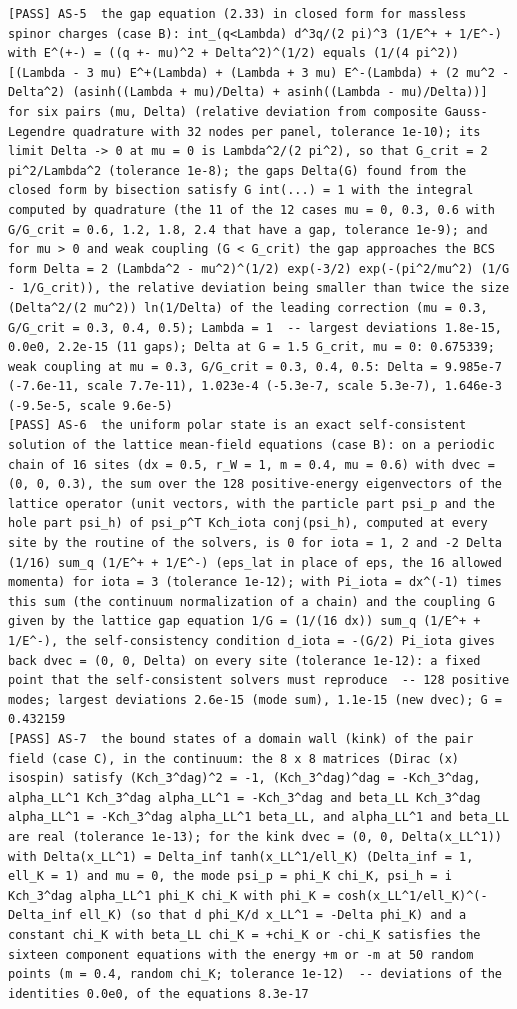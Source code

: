 \documentclass[
  10pt,
]{article}
\begin{document}
\begin{verbatim}
[PASS] AS-5  the gap equation (2.33) in closed form for massless spinor charges (case B): int_(q<Lambda) d^3q/(2 pi)^3 (1/E^+ + 1/E^-) with E^(+-) = ((q +- mu)^2 + Delta^2)^(1/2) equals (1/(4 pi^2)) [(Lambda - 3 mu) E^+(Lambda) + (Lambda + 3 mu) E^-(Lambda) + (2 mu^2 - Delta^2) (asinh((Lambda + mu)/Delta) + asinh((Lambda - mu)/Delta))] for six pairs (mu, Delta) (relative deviation from composite Gauss-Legendre quadrature with 32 nodes per panel, tolerance 1e-10); its limit Delta -> 0 at mu = 0 is Lambda^2/(2 pi^2), so that G_crit = 2 pi^2/Lambda^2 (tolerance 1e-8); the gaps Delta(G) found from the closed form by bisection satisfy G int(...) = 1 with the integral computed by quadrature (the 11 of the 12 cases mu = 0, 0.3, 0.6 with G/G_crit = 0.6, 1.2, 1.8, 2.4 that have a gap, tolerance 1e-9); and for mu > 0 and weak coupling (G < G_crit) the gap approaches the BCS form Delta = 2 (Lambda^2 - mu^2)^(1/2) exp(-3/2) exp(-(pi^2/mu^2) (1/G - 1/G_crit)), the relative deviation being smaller than twice the size (Delta^2/(2 mu^2)) ln(1/Delta) of the leading correction (mu = 0.3, G/G_crit = 0.3, 0.4, 0.5); Lambda = 1  -- largest deviations 1.8e-15, 0.0e0, 2.2e-15 (11 gaps); Delta at G = 1.5 G_crit, mu = 0: 0.675339; weak coupling at mu = 0.3, G/G_crit = 0.3, 0.4, 0.5: Delta = 9.985e-7 (-7.6e-11, scale 7.7e-11), 1.023e-4 (-5.3e-7, scale 5.3e-7), 1.646e-3 (-9.5e-5, scale 9.6e-5)
[PASS] AS-6  the uniform polar state is an exact self-consistent solution of the lattice mean-field equations (case B): on a periodic chain of 16 sites (dx = 0.5, r_W = 1, m = 0.4, mu = 0.6) with dvec = (0, 0, 0.3), the sum over the 128 positive-energy eigenvectors of the lattice operator (unit vectors, with the particle part psi_p and the hole part psi_h) of psi_p^T Kch_iota conj(psi_h), computed at every site by the routine of the solvers, is 0 for iota = 1, 2 and -2 Delta (1/16) sum_q (1/E^+ + 1/E^-) (eps_lat in place of eps, the 16 allowed momenta) for iota = 3 (tolerance 1e-12); with Pi_iota = dx^(-1) times this sum (the continuum normalization of a chain) and the coupling G given by the lattice gap equation 1/G = (1/(16 dx)) sum_q (1/E^+ + 1/E^-), the self-consistency condition d_iota = -(G/2) Pi_iota gives back dvec = (0, 0, Delta) on every site (tolerance 1e-12): a fixed point that the self-consistent solvers must reproduce  -- 128 positive modes; largest deviations 2.6e-15 (mode sum), 1.1e-15 (new dvec); G = 0.432159
[PASS] AS-7  the bound states of a domain wall (kink) of the pair field (case C), in the continuum: the 8 x 8 matrices (Dirac (x) isospin) satisfy (Kch_3^dag)^2 = -1, (Kch_3^dag)^dag = -Kch_3^dag, alpha_LL^1 Kch_3^dag alpha_LL^1 = -Kch_3^dag and beta_LL Kch_3^dag alpha_LL^1 = -Kch_3^dag alpha_LL^1 beta_LL, and alpha_LL^1 and beta_LL are real (tolerance 1e-13); for the kink dvec = (0, 0, Delta(x_LL^1)) with Delta(x_LL^1) = Delta_inf tanh(x_LL^1/ell_K) (Delta_inf = 1, ell_K = 1) and mu = 0, the mode psi_p = phi_K chi_K, psi_h = i Kch_3^dag alpha_LL^1 phi_K chi_K with phi_K = cosh(x_LL^1/ell_K)^(-Delta_inf ell_K) (so that d phi_K/d x_LL^1 = -Delta phi_K) and a constant chi_K with beta_LL chi_K = +chi_K or -chi_K satisfies the sixteen component equations with the energy +m or -m at 50 random points (m = 0.4, random chi_K; tolerance 1e-12)  -- deviations of the identities 0.0e0, of the equations 8.3e-17

\end{verbatim}
\end{document}
